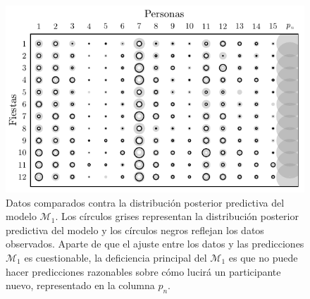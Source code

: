 \documentclass{article}
\begin{document}
\begin{figure}[H]
\centering
\setlength\fboxsep{0pt}
\setlength\fboxrule{0.5pt}
\includegraphics[trim=0cm 0cm 0cm 0cm, clip=true, width=1\textwidth]	{data_pos_pred_m1.pdf}
\caption{Datos comparados contra la distribución posterior predictiva del modelo $\mathcal M_1$. Los círculos grises representan la distribución posterior predictiva del modelo y los círculos negros reflejan los datos observados. Aparte de que el ajuste entre los datos y las predicciones  $\mathcal M_1$ es cuestionable, la deficiencia principal del $\mathcal M_1$ es que no puede hacer predicciones razonables sobre cómo lucirá un participante nuevo, representado en la columna $p_n$.}
\label{fig:data_1}
\end{figure}
\end{document}

